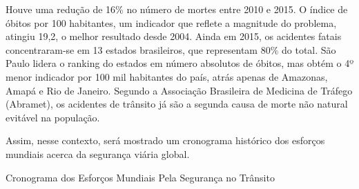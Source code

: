 \documentclass[output=paper,colorlinks,citecolor=green]{langscibook}
\begin{document}
Houve uma redução de 16\% no número de mortes entre 2010 e 2015. O índice de óbitos por 100 habitantes, um indicador que reflete a magnitude do problema, atingiu 19,2, o melhor resultado desde 2004. Ainda em 2015, os acidentes fatais concentraram-se em 13 estados brasileiros, que representam 80\% do total. São Paulo lidera o ranking do estados em número absolutos de óbitos, mas obtém o 4º menor indicador por 100 mil habitantes do país, atrás apenas de Amazonas, Amapá e Rio de Janeiro. Segundo a Associação Brasileira de Medicina de Tráfego (Abramet), os acidentes de trânsito já são a segunda causa de morte não natural evitável na população.\vskip0.3cm


Assim, nesse contexto, será mostrado um cronograma histórico dos esforços mundiais acerca da segurança viária global.\vskip0.3cm


Cronograma dos Esforços Mundiais Pela Segurança no Trânsito 
\end{document}
